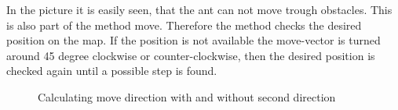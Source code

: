 \documentclass[11pt]{article}
\begin{document}
In the picture it is easily seen, that the ant can not move trough obstacles. This is also part of the method move. Therefore the method checks the desired position on the map. If the position is not available the move-vector is turned around 45 degree clockwise or counter-clockwise, then the desired position is checked again until a possible step is found.

\begin{figure}[h!]
	\centering
	 \hspace*{1cm}
	\caption[Comparison: Using second direction or not]{Calculating move direction with and without second direction}
\end{figure}
\end{document}
